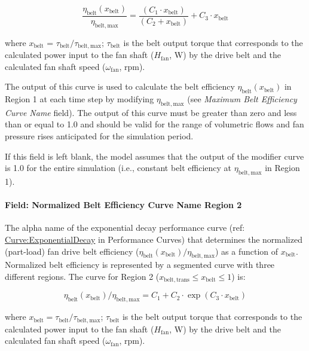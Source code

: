 \begin{equation}
  \frac{\eta_{\mathrm{belt}} ( x_{\mathrm{belt}} )}{\eta_{\mathrm{belt, max}}} = \frac{(C_1 \cdot x_{\mathrm{belt}})}{(C_2 + x_{\mathrm{belt}})} + C_3 \cdot x_{\mathrm{belt}}
\end{equation}

where \(x_{\mathrm{belt}}\) = \(\tau_{\mathrm{belt}} / \tau_{\mathrm{belt, max}}\); \(\tau_{\mathrm{belt}}\) is the belt output torque that corresponds to the calculated power input to the fan shaft (\(H_{\mathrm{fan}}\), W) by the drive belt and the calculated fan shaft speed (\(\omega_{\mathrm{fan}}\), rpm).

The output of this curve is used to calculate the belt efficiency \(\eta_{\mathrm{belt}} (x_{\mathrm{belt}})\) in Region 1 at each time step by modifying \(\eta_{\mathrm{belt, max}}\) (see \emph{Maximum Belt Efficiency Curve Name} field). The output of this curve must be greater than zero and less than or equal to 1.0 and should be valid for the range of volumetric flows and fan pressure rises anticipated for the simulation period.

If this field is left blank, the model assumes that the output of the modifier curve is 1.0 for the entire simulation (i.e., constant belt efficiency at \(\eta_{\mathrm{belt, max}}\) in Region 1).

\paragraph{Field: Normalized Belt Efficiency Curve Name Region 2}\label{field-normalized-belt-efficiency-curve-name-region-2}

The alpha name of the exponential decay performance curve (ref: \hyperref[curveexponentialdecay]{Curve:ExponentialDecay} in Performance Curves) that determines the normalized (part-load) fan drive belt efficiency (\(\eta_{\mathrm{belt}} (x_{\mathrm{belt}}) / \eta_{\mathrm{belt, max}}\)) as a function of \(x_{\mathrm{belt}}\). Normalized belt efficiency is represented by a segmented curve with three different regions. The curve for Region 2 (\(x_{\mathrm{belt, trans}} \le x_{\mathrm{belt}} \le 1\)) is:

\begin{equation}
  \eta_{\mathrm{belt}} (x_{\mathrm{belt}}) / \eta_{\mathrm{belt, max}} = C_1 + C_2 \cdot \exp(C_3 \cdot x_{\mathrm{belt}})
\end{equation}

where \(x_{\mathrm{belt}} = \tau_{\mathrm{belt}} / \tau_{\mathrm{belt, max}}\); \(\tau_{\mathrm{belt}}\) is the belt output torque that corresponds to the calculated power input to the fan shaft (\(H_{\mathrm{fan}}\), W) by the drive belt and the calculated fan shaft speed (\(\omega_{\mathrm{fan}}\), rpm).

